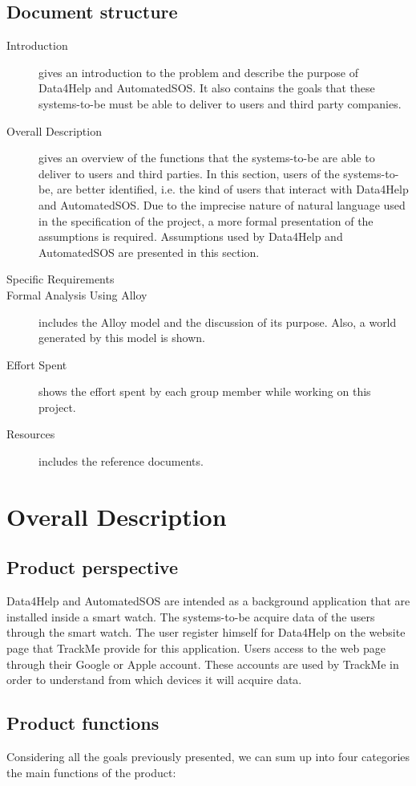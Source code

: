\documentclass{article}
\begin{document}
\subsection{Document structure}
\begin{description}
	\item [Introduction] gives an introduction to the problem and describe the purpose of Data4Help and AutomatedSOS. It also contains the goals that these systems-to-be must be able to deliver to users and third party companies.
	\item [Overall Description] gives an overview of the functions that the systems-to-be are able to deliver to users and third parties. In this section, users of the systems-to-be, are better identified, i.e. the kind of users that interact with Data4Help and AutomatedSOS. Due to the imprecise nature of natural language used in the specification of the project, a more formal presentation of the assumptions is required. Assumptions used by Data4Help and AutomatedSOS are presented in this section. 
	\item [Specific Requirements]
	\item [Formal Analysis Using Alloy] includes the Alloy model and the discussion of its purpose. Also, a world generated by this model is shown.
	\item [Effort Spent] shows the effort spent by each group member while working on this project.
	\item [Resources] includes the reference documents. 
\end{description}
\section{Overall Description}
\subsection{Product perspective}
Data4Help and AutomatedSOS are intended as a background application that are installed inside a smart watch. The systems-to-be acquire data of the users through the smart watch. The user register himself for Data4Help on the website page that TrackMe provide for this application. Users access to the web page through their Google or Apple account. These accounts are used by TrackMe in order to understand from which devices it will acquire data.
\subsection{Product functions}
Considering all the goals previously presented, we can sum up into four categories the main functions of the product:
\end{document}
